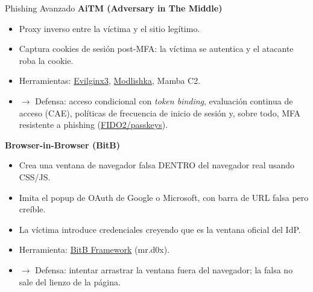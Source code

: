 \documentclass[aspectratio=169,11pt]{beamer}
\newcommand{\lead}[1]{{\color{uznavy}\bfseries #1}\par\smallskip}
\begin{document}
\begin{frame}{Phishing Avanzado}
\footnotesize
\lead{AiTM (Adversary in The Middle)}
  \begin{itemize}
  \item Proxy inverso entre la víctima y el sitio legítimo.
  \item Captura cookies de sesión post-MFA: la víctima se autentica y el atacante roba la cookie.
  \item Herramientas: \href{https://github.com/kgretzky/evilginx2}{Evilginx3}, \href{https://github.com/drk1wi/Modlishka}{Modlishka}, Mamba C2.
  \item $\rightarrow$ Defensa: acceso condicional con \emph{token binding}, evaluación continua de acceso (CAE), políticas de frecuencia de inicio de sesión y, sobre todo, MFA resistente a phishing (\href{https://fidoalliance.org/passkeys/}{FIDO2/passkeys}).
  \end{itemize}

\lead{Browser-in-Browser (BitB)}
  \begin{itemize}
  \item Crea una ventana de navegador falsa DENTRO del navegador real usando CSS/JS.
  \item Imita el popup de OAuth de Google o Microsoft, con barra de URL falsa pero creíble.
  \item La víctima introduce credenciales creyendo que es la ventana oficial del IdP.
  \item Herramienta: \href{https://github.com/mrd0x/BITB}{BitB Framework} (mr.d0x).
  \item $\rightarrow$ Defensa: intentar arrastrar la ventana fuera del navegador; la falsa no sale del lienzo de la página.
  \end{itemize}
\end{frame}
\end{document}
